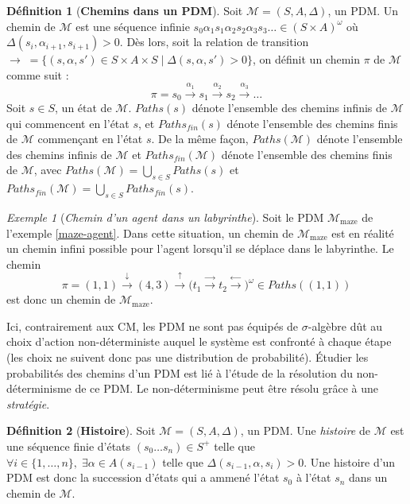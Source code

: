 \documentclass[12pt,a4paper]{report}
\theoremstyle{definition}%
\newtheorem{definition}{Définition}[chapter]
\theoremstyle{remark}
\newtheorem{example}{Exemple}[chapter]
\begin{document}
\begin{definition}[\textbf{Chemins dans un PDM}]
	Soit $\mathcal{M} = (S, A, \Delta)$, un PDM. Un chemin de $\mathcal{M}$ est une
	séquence infinie $s_0 \alpha_1 s_1 \alpha_2 s_2 \alpha_3 s_3 \dots \in (S \times A)^\omega$
	où $\Delta(s_i, \alpha_{i+1}, s_{i+1}) > 0$. Dès lors, soit la relation de
	transition
	$\rightarrow \; =  \{ (s, \alpha, s') \in S \times A \times S \; | \; \Delta(s, \alpha, s') > 0 \}$,
	on définit un chemin $\pi$ de $\mathcal{M}$ comme suit :
	\[ \pi = s_0 \xrightarrow{\alpha_1} s_1 \xrightarrow{\alpha_2} s_2 \xrightarrow{\alpha_3} \dots \]
	Soit $s \in S$, un état de $\mathcal{M}$. $Paths(s)$ dénote l'ensemble des chemins
	infinis de $\mathcal{M}$ qui commencent en l'état $s$, et
	$Paths_{fin}(s)$ dénote l'ensemble des chemins finis de $\mathcal{M}$ commençant en l'état $s$.
	De la même façon, $Paths(\mathcal{M})$ dénote l'ensemble des chemins infinis de $\mathcal{M}$ et $Paths_{fin}(\mathcal{M})$ dénote l'ensemble des chemins finis de
	$\mathcal{M}$, avec $Paths(\mathcal{M}) = \bigcup_{s \in S} Paths(s)$ et
	$Paths_{fin}(\mathcal{M}) = \bigcup_{s \in S} Paths_{fin}(s)$.
\end{definition}

\begin{example}[\textit{Chemin d'un agent dans un labyrinthe}]
	Soit le PDM $\mathcal{M}_{\text{maze}}$ de l'exemple \ref{maze-agent}.
	Dans cette situation, un chemin de $\mathcal{M}_{\text{maze}}$ est en réalité
	un chemin infini possible pour l'agent lorsqu'il se déplace dans le labyrinthe.
	Le chemin
	\[\pi = (1,1) \xrightarrow{\downarrow} (4,3) \xrightarrow{\uparrow}
	\big(t_1 \xrightarrow{\rightarrow} t_2 \xrightarrow{\leftarrow} \big)^\omega \in Paths((1,1))\]
	est donc un chemin de $\mathcal{M}_{\text{maze}}$.

\end{example}

Ici, contrairement aux CM, les PDM ne sont pas équipés de $\sigma$-algèbre dût au
choix d'action
non-déterministe auquel le système est confronté à chaque étape (les choix ne suivent
donc pas une distribution de probabilité). \'Etudier les probabilités des chemins
d'un PDM est lié à l'étude de la résolution du non-déterminisme de ce PDM.
Le non-déterminisme peut être résolu grâce à une \textit{stratégie}.

\begin{definition}[\textbf{Histoire}]
	Soit $\mathcal{M} = (S, A, \Delta)$, un PDM. Une \textit{histoire} de $\mathcal{M}$
	est une séquence finie d'états $(s_0 \dots s_n) \in S^+$ telle que
	$\forall i \in \{1, \dots, n \}, \; \exists \alpha \in A(s_{i-1})$ telle que $\Delta(s_{i-1}, \alpha, s_i) > 0$.
	Une histoire d'un PDM est donc la succession d'états qui a ammené l'état $s_0$ à l'état $s_n$ dans
	un chemin de $\mathcal{M}$.
\end{definition}
\end{document}
